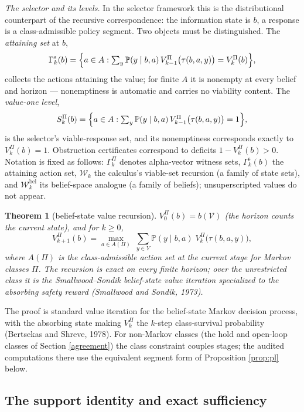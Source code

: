 \documentclass[10pt,twocolumn]{article}
\theoremstyle{plain}
\newtheorem{theorem}{Theorem}
\theoremstyle{definition}
\theoremstyle{remark}
\begin{document}
\emph{The selector and its levels.} In the selector framework this is the
distributional counterpart of the recursive correspondence: the
information state is \(b\), a response is a class-admissible policy
segment. Two objects must be distinguished. The \emph{attaining set} at
\(b\),
\[
\Gamma^{\mathrm{s}}_{k}(b) = \Bigl\{ a \in A : \textstyle\sum_{y}
\mathbb{P}(y \mid b, a)\, V^{\Pi}_{k-1}\bigl(\tau(b, a, y)\bigr)
= V^{\Pi}_{k}(b) \Bigr\},
\]
collects the actions attaining the value; for finite \(A\) it is nonempty
at every belief and horizon --- nonemptiness is automatic and carries no
viability content. The \emph{value-one level},
\[
S^{\Pi}_{k}(b) = \Bigl\{ a \in A : \textstyle\sum_{y} \mathbb{P}(y \mid
b, a)\, V^{\Pi}_{k-1}\bigl(\tau(b, a, y)\bigr) = 1 \Bigr\},
\]
is the selector's viable-response set, and its nonemptiness corresponds
exactly to \(V^{\Pi}_{k}(b) = 1\). Obstruction certificates correspond to
deficits \(1 - V^{\Pi}_{k}(b) > 0\). Notation is fixed as follows:
\(\Gamma^{\Pi}_{k}\) denotes alpha-vector witness sets,
\(\Gamma^{\mathrm{s}}_{k}(b)\) the attaining action set,
\(\mathcal{W}_{k}\) the calculus's viable-set recursion (a family of
state sets), and \(\mathcal{W}^{\mathrm{bel}}_{k}\) its belief-space
analogue (a family of beliefs); unsuperscripted values do not appear.

\begin{theorem}[belief-state value recursion]\label{thm:recursion}
\(V^{\Pi}_{0}(b) = b(\mathcal{V})\) (the horizon counts the current
state), and for \(k \ge 0\),
\[
V^{\Pi}_{k+1}(b) = \max_{a \in A(\Pi)}\; \sum_{y \in Y} \mathbb{P}(y \mid
b, a)\; V^{\Pi}_{k}\bigl(\tau(b, a, y)\bigr),
\]
where \(A(\Pi)\) is the class-admissible action set at the current stage
for Markov classes \(\Pi\). The recursion is exact on every finite
horizon; over the unrestricted class it is the Smallwood--Sondik
belief-state value iteration specialized to the absorbing safety reward
(Smallwood and Sondik, 1973).
\end{theorem}

The proof is standard value iteration for the belief-state Markov decision
process, with the absorbing state making \(V^{\Pi}_{k}\) the \(k\)-step
class-survival probability (Bertsekas and Shreve, 1978). For non-Markov
classes (the hold and open-loop classes of Section \ref{agreement}) the
class constraint couples stages; the audited computations there use the
equivalent segment form of Proposition \ref{prop:pl} below.

\subsection{The support identity and exact sufficiency}\label{support}
\end{document}
